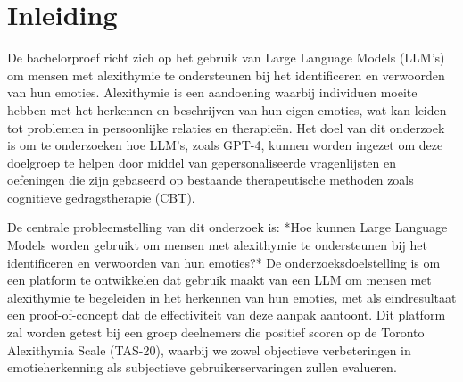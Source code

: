 


% 

\section{Inleiding}%
\label{sec:inleiding}

De bachelorproef richt zich op het gebruik van Large Language Models (LLM's) om mensen met alexithymie te ondersteunen bij het identificeren en verwoorden van hun emoties. Alexithymie is een aandoening waarbij individuen moeite hebben met het herkennen en beschrijven van hun eigen emoties, wat kan leiden tot problemen in persoonlijke relaties en therapieën. Het doel van dit onderzoek is om te onderzoeken hoe LLM's, zoals GPT-4, kunnen worden ingezet om deze doelgroep te helpen door middel van gepersonaliseerde vragenlijsten en oefeningen die zijn gebaseerd op bestaande therapeutische methoden zoals cognitieve gedragstherapie (CBT).

De centrale probleemstelling van dit onderzoek is: *Hoe kunnen Large Language Models worden gebruikt om mensen met alexithymie te ondersteunen bij het identificeren en verwoorden van hun emoties?* De onderzoeksdoelstelling is om een platform te ontwikkelen dat gebruik maakt van een LLM om mensen met alexithymie te begeleiden in het herkennen van hun emoties, met als eindresultaat een proof-of-concept dat de effectiviteit van deze aanpak aantoont. Dit platform zal worden getest bij een groep deelnemers die positief scoren op de Toronto Alexithymia Scale (TAS-20), waarbij we zowel objectieve verbeteringen in emotieherkenning als subjectieve gebruikerservaringen zullen evalueren.


